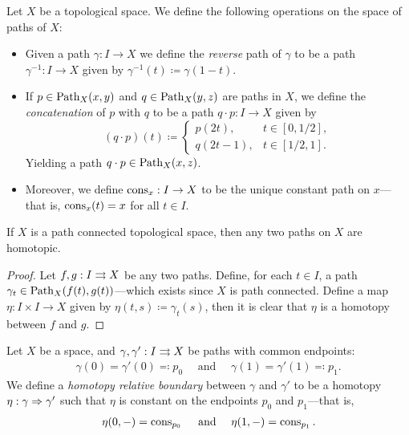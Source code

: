 \begin{definition}
\label{def:operations-paths}
Let \(X\) be a topological space. We define the following operations on the
space of paths of \(X\):
\begin{itemize}\setlength\itemsep{0em}
\item Given a path \(\gamma: I \to X\) we define the \emph{reverse} path of
  \(\gamma\) to be a path \(\gamma^{-1}: I \to X\) given by
  \(\gamma^{-1}(t) \coloneq \gamma(1 - t)\).

\item If \(p \in \operatorname{Path}_X(x, y)\) and \(q \in \operatorname{Path}_X(y, z)\) are paths in \(X\),
  we define the \emph{concatenation} of \(p\) with \(q\) to be a path \(q \cdot
  p: I \to X\) given by
  \[
  (q \cdot p)(t) \coloneq
  \begin{cases}
    p(2 t), &t \in [0, 1/2], \\
    q(2 t - 1), &t \in [1/2, 1].
  \end{cases}
  \]
  Yielding a path \(q \cdot p \in \operatorname{Path}_X(x, z)\).

\item Moreover, we define \(\operatorname{cons}_x: I \to X\) to be the unique constant path
  on \(x\)---that is, \(\operatorname{cons}_x(t) = x\) for all \(t \in I\).
\end{itemize}
\end{definition}

\begin{proposition}
\label{prop:path-connected-fundamental-groupoid-trivial}
If \(X\) is a path connected topological space, then any two paths on \(X\) are
homotopic.
\end{proposition}

\begin{proof}
Let \(f, g: I \rightrightarrows X\) be any two paths. Define, for each \(t \in I\), a path
\(\gamma_t \in
\operatorname{Path}_X(f(t), g(t))\)---which exists since \(X\) is path connected. Define a map
\(\eta: I \times I \to X\) given by \(\eta(t, s) \coloneq \gamma_t(s)\), then it
is clear that \(\eta\) is a homotopy between \(f\) and \(g\).
\end{proof}

\begin{definition}
\label{def:htpy-relative-boundary}
Let \(X\) be a space, and \(\gamma, \gamma': I \rightrightarrows X\) be paths with common
endpoints:
\begin{align*}
 \gamma(0) = \gamma'(0) \eqqcolon p_0\quad \text{ and }\quad
 \gamma(1) = \gamma'(1) \eqqcolon p_1.
\end{align*}
We define a \emph{homotopy relative boundary} between \(\gamma\) and \(\gamma'\)
to be a homotopy \(\eta: \gamma \Rightarrow \gamma'\) such that \(\eta\) is constant on
the endpoints \(p_0\) and \(p_1\)---that is,
\begin{align*}
  \eta(0, -) = \operatorname{cons}_{p_0}\quad \text{ and }\quad \eta(1, -) = \operatorname{cons}_{p_1}.
\end{align*}
\end{definition}

